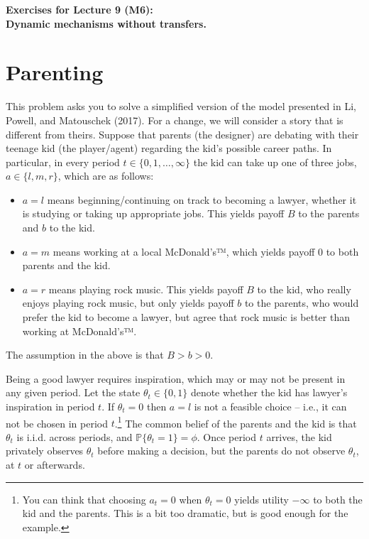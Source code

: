 \documentclass[a4paper]{article}
\begin{document}
\begin{center}
		\LARGE\textbf{Exercises for Lecture 9 (M6):\\ Dynamic mechanisms without transfers.}
\end{center}



\section{Parenting}
	
	This problem asks you to solve a simplified version of the model presented in Li, Powell, and Matouschek (2017). 
	For a change, we will consider a story that is different from theirs. Suppose that parents (the designer) are debating with their teenage kid (the player/agent) regarding the kid's possible career paths. In particular, in every period $t \in \{0,1,\dots,\infty\}$ the kid can take up one of three jobs, $a \in \{l,m,r\}$, which are as follows:
	\begin{itemize}
		\item $a=l$ means beginning/continuing on track to becoming a lawyer, whether it is studying or taking up appropriate jobs. This yields payoff $B$ to the parents and $b$ to the kid.
		
		\item $a=m$ means working at a local McDonald's™, which yields payoff $0$ to both parents and the kid. 
		
		\item $a=r$ means playing rock music. This yields payoff $B$ to the kid, who really enjoys playing rock music, but only yields payoff $b$ to the parents, who would prefer the kid to become a lawyer, but agree that rock music is better than working at McDonald's™.
	\end{itemize}
	The assumption in the above is that $B>b>0$.
	
	Being a good lawyer requires inspiration, which may or may not be present in any given period. Let the state $\theta_t \in \{0,1\}$ denote whether the kid has lawyer's inspiration in period $t$. If $\theta_t=0$ then $a=l$ is not a feasible choice -- i.e., it can not be chosen in period $t$.\footnote{You can think that choosing $a_t=0$ when $\theta_t=0$ yields utility $-\infty$ to both the kid and the parents. This is a bit too dramatic, but is good enough for the example.} The common belief of the parents and the kid is that $\theta_t$ is i.i.d. across periods, and $\mathbb{P}\{\theta_t=1\} = \phi$. Once period $t$ arrives, the kid privately observes $\theta_t$ before making a decision, but the parents do not observe $\theta_t$, at $t$ or afterwards.
	
\end{document}
